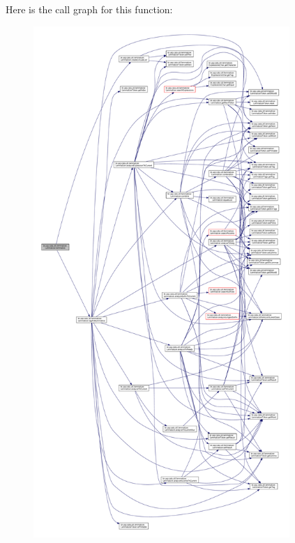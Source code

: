 Here is the call graph for this function\+:\nopagebreak
\begin{figure}[H]
\begin{center}
\leavevmode
\includegraphics[height=550pt]{classbr_1_1usp_1_1cata_1_1util_1_1lemmatizer_1_1_lemmatizer_a7bc40a2c75a57c90796b0f2c2c4ddb3d_cgraph}
\end{center}
\end{figure}


